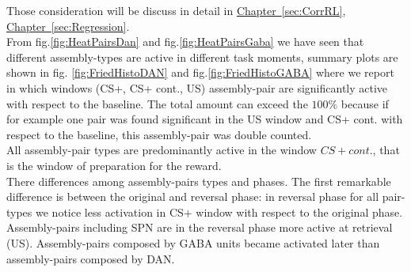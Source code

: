 Those consideration will be discuss in detail in \hyperref[sec:CorrRL]{Chapter~\ref*{sec:CorrRL}}, \hyperref[sec:Regression]{Chapter~\ref*{sec:Regression}}.\\From fig.\ref{fig:HeatPairsDan} and fig.\ref{fig:HeatPairsGaba} we have seen that different assembly-types are active in different task moments, summary plots are shown in fig. \ref{fig:FriedHistoDAN} and fig.\ref{fig:FriedHistoGABA} where we report in which windows (CS+, CS+ cont., US) assembly-pair are significantly active with respect to the baseline. The total amount can exceed the $100\%$ because if for example one pair was found significant in the US window and CS+ cont. with respect to the baseline, this assembly-pair was double counted.\\All assembly-pair types are predominantly active in the window $CS+ cont.$, that is the window of preparation for the reward.\\There differences among assembly-pairs types and phases. The first remarkable difference is between the original and reversal phase: in reversal phase for all pair-types we notice less activation in CS+ window with respect to the original phase. Assembly-pairs including SPN are in the reversal phase more active at retrieval (US). Assembly-pairs composed by GABA units became activated later than assembly-pairs composed by DAN.
